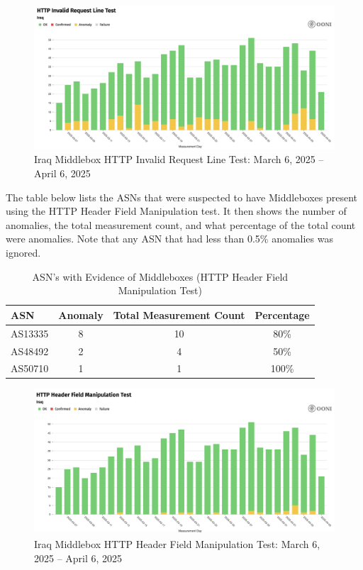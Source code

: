 \begin{figure}[H]
    \centering
    \includegraphics[width=\textwidth]{Griff/TCD SCSS CAPSTONE/Results/IraqMiddleboxHTTPInvalidTest.png}
    \caption{Iraq Middlebox HTTP Invalid Request Line Test: March 6, 2025 -- April 6, 2025}
    \label{fig:iraq-middlebox-invalid-request}
\end{figure}

The table below lists the ASNs that were suspected to have Middleboxes present using the HTTP Header Field Manipulation test. It then shows the number of anomalies, the total measurement count, and what percentage of the total count were anomalies. Note that any ASN that had less than 0.5\% anomalies was ignored.

\begin{table}[H]
\centering
\caption{ASN's with Evidence of Middleboxes (HTTP Header Field Manipulation Test)}
\begin{tabular}{lccc}
\toprule
\textbf{ASN} & \textbf{Anomaly} & \textbf{Total Measurement Count} & \textbf{Percentage} \\
\midrule
AS13335   & 8 & 10 & 80\% \\
AS48492   & 2 & 4 & 50\% \\
AS50710   & 1 & 1 & 100\% \\
\bottomrule
\end{tabular}
\label{tab:category_block}
\end{table}

\begin{figure}[H]
    \centering
    \includegraphics[width=\textwidth]{Griff/TCD SCSS CAPSTONE/Results/IraqMiddleboxHTTPManipulation.png}
    \caption{Iraq Middlebox HTTP Header Field Manipulation Test: March 6, 2025 -- April 6, 2025}
    \label{fig:iraq-middlebox-HTTP-manipulation}
\end{figure}

